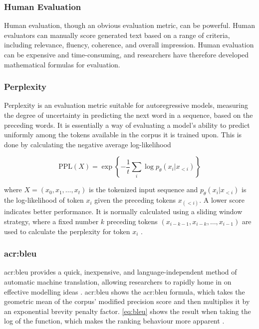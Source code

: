 \subsubsection{Human Evaluation}

Human evaluation, though an obvious evaluation metric, can be powerful. Human evaluators can manually score generated text based on a range of criteria, including relevance, fluency, coherence, and overall impression. Human evaluation can be expensive and time-consuming, and researchers have therefore developed mathematical formulas for evaluation.

\subsubsection{Perplexity}

Perplexity is an evaluation metric suitable for autoregressive models, measuring the degree of uncertainty in predicting the next word in a sequence, based on the preceding words. It is essentially a way of evaluating a model's ability to predict uniformly among the tokens available in the corpus it is trained upon. This is done by calculating the negative average log-likelihood

\begin{equation}
    \text{PPL}(X) = \exp \left\{ -\frac{1}{t} \sum_{i} \log p_\theta(x_i | x_{<i}) \right\}
    \label{eq:ppl}
\end{equation}

\noindent where $X = (x_0, x_1, \ldots, x_t)$ is the tokenized input sequence and $p_\theta(x_i | x_{<i})$ is the log-likelihood of token $x_i$ given the preceding tokens $x_(<i)$. A lower score indicates better performance. It is normally calculated using a sliding window strategy, where a fixed number $k$ preceding tokens $(x_{i-k-1},x_{i-k},\ldots,x_{i-1})$ are used to calculate the perplexity for token $x_i$ \citep{huggingfacePerplexityFixedlengthModels}.

\subsubsection[BiLingual Evaluation Understudy]{\acrfull{acr:bleu}}

\gls{acr:bleu} provides a quick, inexpensive, and language-independent method of automatic machine translation, allowing researchers to rapidly home in on effective modelling ideas \citep{papineniBleuMethodAutomatic2002}. \gls{acr:bleu} shows the \gls{acr:bleu} formula, which takes the geometric mean of the corpus' modified precision score and then multiplies it by an exponential brevity penalty factor. \eqref{eq:bleu} shows the result when taking the log of the function, which makes the ranking behaviour more apparent \citep[5]{papineniBleuMethodAutomatic2002}.

